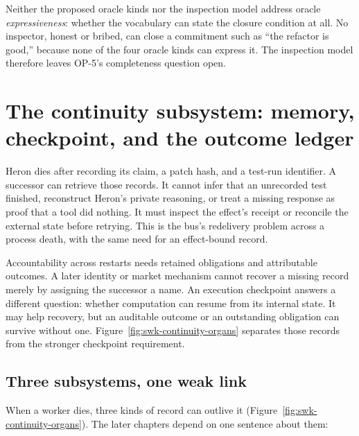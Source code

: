 \documentclass[11pt,a4paper]{article}
\theoremstyle{definition}
\theoremstyle{remark}
\begin{document}
Neither the proposed oracle kinds nor the inspection model address oracle
\emph{expressiveness}: whether the vocabulary
can state the closure condition at all. No inspector, honest or bribed, can
close a commitment such as ``the refactor is good,'' because none of the four
oracle kinds can express it. The inspection model therefore leaves OP-5's
completeness question open.

\pdexercisepointer{\ref{ex:swk-monitor-rules-precommit}}{\ref{ex:swk-op5-oracle}}{\pageref{ex:swk-monitor-rules-precommit}}

\section{The continuity subsystem: memory, checkpoint, and the outcome ledger}
\label{sec:continuity}

Heron dies after recording its claim, a patch hash, and a test-run identifier.
A successor can retrieve those records. It cannot infer that an unrecorded test
finished, reconstruct Heron's private reasoning, or treat a missing response
as proof that a tool did nothing. It must inspect the effect's receipt or
reconcile the external state before retrying. This is the bus's redelivery
problem across a process death, with the same need for an effect-bound record.

Accountability across restarts needs retained obligations and attributable
outcomes. A later identity or market mechanism cannot recover a missing
record merely by assigning the successor a name. An execution checkpoint
answers a different question: whether computation can resume from its internal
state. It may help recovery, but an auditable outcome or an outstanding
obligation can survive without one. Figure~\ref{fig:swk-continuity-organs}
separates those records from the stronger checkpoint requirement.



\subsection{Three subsystems, one weak link}

When a worker dies, three kinds of record can outlive it
(Figure~\ref{fig:swk-continuity-organs}). The later chapters depend on one
sentence about them:
\end{document}
